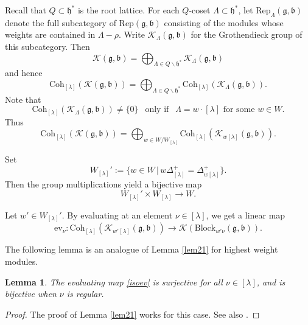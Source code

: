 \documentclass[12pt,a4paper]{amsart}
\newcommand{\CK}{{\mathcal {K}}}
\newcommand{\g}{\mathfrak g}
\newcommand{\h}{\mathfrak h}
\renewcommand{\b}{\mathfrak b}
\newcommand{\be}{\begin {equation}}
\newcommand{\ee}{\end {equation}}
\numberwithin{equation}{section}
\newtheorem{lem}[thm]{Lemma}
\theoremstyle{remark}
\def\Coh{\mathrm{Coh}}
\newcommand{\Lam}{{[\lambda]}}
\begin{document}

 Recall that $Q\subset \h^*$ is the root lattice.
For each $Q$-coset  $\Lambda\subset \h^*$,
 let $\mathrm{Rep}_{\Lambda}(\g, \b)$ denote the full subcategory of $\mathrm{Rep}(\g, \b)$ consisting of the modules whose weights are contained in $\Lambda-\rho$.
 Write $\CK_{ \Lambda}(\g, \b)$ for the Grothendieck group of this subcategory. Then
 \[
   \CK(\g, \b)=\bigoplus_{\Lambda\in Q\backslash \h^*} \CK_{ \Lambda}(\g, \b)
 \]
 and hence
\[
 \Coh_{\Lam}( \CK(\g,\b))=\bigoplus_{\Lambda\in Q\backslash \h^*}\Coh_{\Lam}(\CK_{ \Lambda}(\g, \b) ).
\]
Note that
\[
  \Coh_{\Lam}(\CK_{ \Lambda}(\g, \b))\neq \{0\} \ \ \textrm{ only if } \ \ \Lambda=w \cdot \Lam \textrm{ for some $w\in W$}.
\]
Thus
\be\label{decLam}
 \Coh_{\Lam}( \CK(\g,\b))=\bigoplus_{w\in W/W_\Lam}\Coh_{\Lam}(\CK_{ w \Lam}(\g, \b) ).
\ee


Set
\[
  W_\Lam':=\{w\in W\,|\,  w\Delta_\Lam^+ = \Delta_{w\Lam}^+\}.
\]
Then the group multiplications yield a bijective map
\[
  W_\Lam'\times W_\Lam\rightarrow W.
\]


Let $w'\in W_\Lam'$. %
By evaluating at an element $\nu\in \Lam$, we get a linear map
\be\label{isoev}
 \mathrm{ev}_\nu:   \Coh_{\Lam}( \CK_{w'\Lam}(\g,\b))\rightarrow \CK(\mathrm{Block}_{w'\nu}(\g, \b)).
\ee

The following lemma is an analogue of Lemma \ref{lem21} for highest weight modules.

\begin{lem}\label{surv}
The evaluating map \eqref{isoev} is surjective for all $\nu\in \Lam$, and  is bijective when $\nu$ is regular.
\end{lem}
\begin{proof}
The proof of Lemma \ref{lem21} works for this case. See also \cite[Theorem 7.7]{Mil}.
\end{proof}
\end{document}
